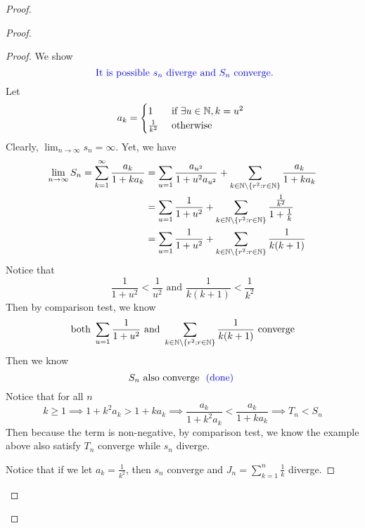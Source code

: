 \documentclass{report}
\begin{document}
\begin{proof}
\begin{proof}
\begin{proof}
We show
\begin{equation}
\textcolor{blue}{\text{ It is possible $s_n$ diverge and $S_n$ converge.}}
\end{equation}
Let 
\begin{equation}
a_k=\begin{cases}
  1& \text{ if $\exists u\in\mathbb{N}, k=u^2$ }\\
  \frac{1}{k^2}& \text{ otherwise }
\end{cases}
\end{equation}
Clearly,  $\lim_{n\to\infty}s_n=\infty$. Yet, we have
\begin{align}
  \lim_{n\to\infty}S_n=\sum_{k=1}^\infty \frac{a_k}{1+ka_k}&=\sum_{u=1}\frac{a_{u^2}}{1+u^2a_{u^2}}+\sum_{k\in\mathbb{N}\setminus \{ r^2:r\in\mathbb{N} \}}\frac{a_k}{1+ka_k}\\
&=\sum_{u=1}\frac{1}{1+u^2}+\sum_{k\in\mathbb{N}\setminus \{ r^2:r\in\mathbb{N} \}}\frac{\frac{1}{k^2}}{1+\frac{1}{k}}\\
&=\sum_{u=1}\frac{1}{1+u^2}+\sum_{k\in\mathbb{N}\setminus \{ r^2:r\in\mathbb{N} \}} \frac{1}{k(k+1)}
\end{align}
Notice that 
\begin{equation}
\frac{1}{1+u^2}<\frac{1}{u^2}\text{ and }\frac{1}{k(k+1)}<\frac{1}{k^2}
\end{equation}
Then by comparison test, we know 
\begin{equation}
\text{ both }\sum_{u=1}\frac{1}{1+u^2}\text{ and }\sum_{k\in\mathbb{N}\setminus \{ r^2:r\in\mathbb{N} \}} \frac{1}{k(k+1)}\text{ converge }
\end{equation}
Then we know
\begin{equation}
S_n\text{ also converge }\textcolor{blue}{\text{ (done) }}
\end{equation}
Notice that for all $n$
\begin{equation}
k\geq 1\implies 1+k^2a_k>1+ka_k\implies \frac{a_k}{1+k^2a_k}<\frac{a_k}{1+ka_k}\implies T_n<S_n
\end{equation}
Then because the term is non-negative, by comparison test, we know the example above also satisfy $T_n$ converge while $s_n$ diverge.

Notice that if we let $a_k=\frac{1}{k^2}$, then $s_n$ converge and $J_n=\sum_{k=1}^n \frac{1}{k}$ diverge. 


\end{proof}
\end{proof}
\end{proof}
\end{document}
